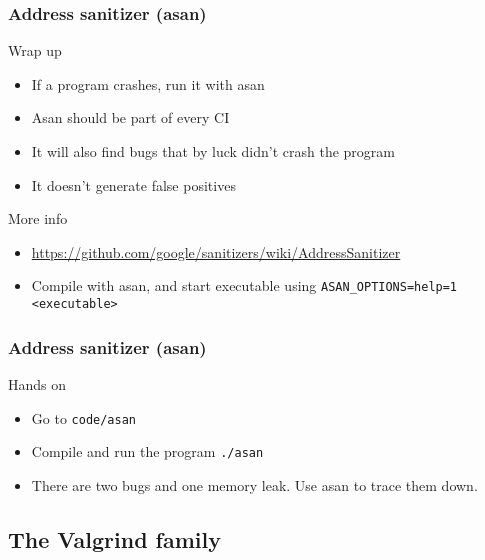 \begin{frame}[fragile]
  \frametitle{Address sanitizer (asan)}
  \begin{block}{Wrap up}
    \begin{itemize}
      \item If a program crashes, run it with asan
      \item Asan should be part of every \cpp{} CI
      \item It will also find bugs that by luck didn't crash the program
      \item It doesn't generate false positives
    \end{itemize}
  \end{block}

  \begin{exampleblock}{More info}
    \begin{itemize}
      \item \url{https://github.com/google/sanitizers/wiki/AddressSanitizer}
      \item Compile with asan, and start executable using \texttt{ASAN_OPTIONS=help=1 <executable>}
    \end{itemize}
  \end{exampleblock}
\end{frame}

\begin{frame}[fragile]
  \frametitle{Address sanitizer (asan)}
  \begin{alertblock}{Hands on}
    \begin{itemize}
      \item Go to \texttt{code/asan}
      \item Compile and run the program \texttt{./asan}
      \item There are two bugs and one memory leak. Use asan to trace them down.
    \end{itemize}
  \end{alertblock}

\end{frame}


\subsection[valgrind]{The Valgrind family}

